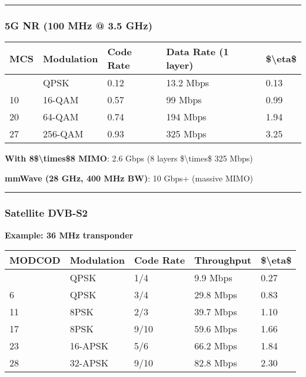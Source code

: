 \begin{center}\rule{0.5\linewidth}{0.5pt}\end{center}

\subsubsection{5G NR (100 MHz @ 3.5 GHz)}\label{g-nr-100-mhz-3.5-ghz}

{\def\LTcaptype{} %
\begin{longtable}[]{@{}lllll@{}}
\toprule\noalign{}
MCS & Modulation & Code Rate & Data Rate (1 layer) &
\$\textbackslash eta\$ \\
\midrule\noalign{}
\endhead
\bottomrule\noalign{}
\endlastfoot
0 & QPSK & 0.12 & 13.2 Mbps & 0.13 \\
10 & 16-QAM & 0.57 & 99 Mbps & 0.99 \\
20 & 64-QAM & 0.74 & 194 Mbps & 1.94 \\
27 & 256-QAM & 0.93 & 325 Mbps & 3.25 \\
\end{longtable}
}

\textbf{With 8\$\textbackslash times\$8 MIMO}: 2.6 Gbps (8 layers
\$\textbackslash times\$ 325 Mbps)

\textbf{mmWave (28 GHz, 400 MHz BW)}: 10 Gbps+ (massive MIMO)

\begin{center}\rule{0.5\linewidth}{0.5pt}\end{center}

\subsubsection{Satellite DVB-S2}\label{satellite-dvb-s2}

\textbf{Example: 36 MHz transponder}

{\def\LTcaptype{} %
\begin{longtable}[]{@{}lllll@{}}
\toprule\noalign{}
MODCOD & Modulation & Code Rate & Throughput & \$\textbackslash eta\$ \\
\midrule\noalign{}
\endhead
\bottomrule\noalign{}
\endlastfoot
1 & QPSK & 1/4 & 9.9 Mbps & 0.27 \\
6 & QPSK & 3/4 & 29.8 Mbps & 0.83 \\
11 & 8PSK & 2/3 & 39.7 Mbps & 1.10 \\
17 & 8PSK & 9/10 & 59.6 Mbps & 1.66 \\
23 & 16-APSK & 5/6 & 66.2 Mbps & 1.84 \\
28 & 32-APSK & 9/10 & 82.8 Mbps & 2.30 \\
\end{longtable}
}

